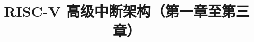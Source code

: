 
\begin{translation}
\label{cha:translation}

\title{RISC-V 高级中断架构（第一章至第三章）}
\maketitle

\tableofcontents


\end{translation}
